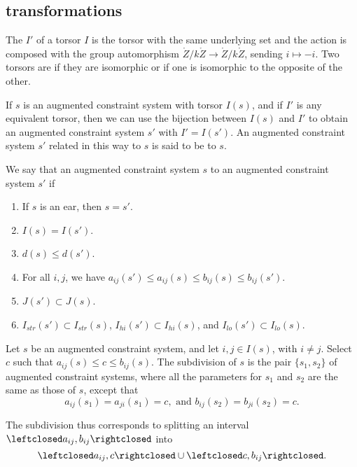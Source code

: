 \subsection{transformations}



\begin{definition} The  $I'$ of a torsor $I$ is the torsor with the
same underlying set and the action is composed with the group automorphism
$\ring{Z}/k\ring{Z}\to\ring{Z}/k\ring{Z}$, sending $i\mapsto -i$.
Two torsors are  if they are isomorphic or if 
one is isomorphic to the opposite of the other.
\end{definition}

If $s$ is an augmented constraint system with torsor $I(s)$, and if
$I'$ is any equivalent torsor, then we can use the bijection between $I(s)$ and $I'$
to obtain an augmented constraint system $s'$ with $I' = I(s')$.  An
augmented constraint system $s'$ related in this way to $s$ is said
to be  to $s$.

\begin{definition}  We say that an augmented constraint system $s$
 to an augmented constraint system $s'$ if
\begin{enumerate}
\item If $s$ is an ear, then $s=s'$.
\item $I(s) = I(s')$.
\item $d(s)\le d(s')$.
\item For all $i,j$, we have $a_{ij}(s')\le a_{ij}(s)\le b_{ij}(s)\le b_{ij}(s')$.
\item $J(s')\subset J(s)$.
\item $I_{str}(s')\subset I_{str}(s)$, $I_{hi}(s')\subset I_{hi}(s)$, and
$I_{lo}(s')\subset I_{lo}(s)$.
\end{enumerate}
\end{definition}

\begin{definition}[subdivision] Let $s$ be an augmented constraint system,
and let $i,j\in  I(s)$, with $i\ne j$.  Select $c$ such that $a_{ij}(s)\le c\le b_{ij}(s)$.
The subdivision of $s$ is the pair $\{s_1,s_2\}$ 
of augmented constraint systems, where all the parameters for $s_1$ and $s_2$
are the same as those of $s$, except that
\[
a_{ij}(s_1)=a_{ji}(s_1) = c, \text{ and } b_{ij}(s_2) = b_{ji}(s_2)=c.
\]
\end{definition}
The subdivision thus corresponds to splitting an interval 
$\leftclosed a_{ij},b_{ij}\rightclosed$ into
\[
\leftclosed a_{ij},c\rightclosed \cup \leftclosed c,b_{ij}\rightclosed.
\]

